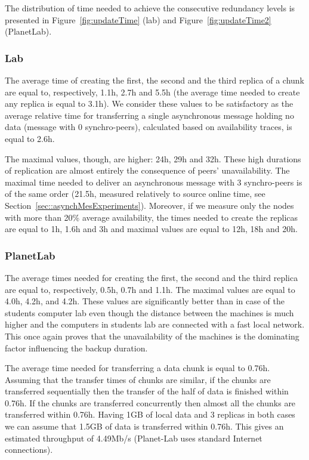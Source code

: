\documentclass[10pt, final, conference, letterpaper]{IEEEtran}
\begin{document}
The distribution of time needed to achieve the consecutive redundancy levels is presented in Figure~\ref{fig:updateTime} (lab) and Figure~\ref{fig:updateTime2} (PlanetLab).

\subsubsection{Lab}

The average time of creating the first, the second and the third replica of a chunk are equal to, respectively, 1.1h, 2.7h and 5.5h (the average time needed to create any replica is equal to 3.1h). We consider these values to be satisfactory as the average relative time for transferring a single asynchronous message holding no data (message with 0 synchro-peers), calculated based on availability traces, is equal to 2.6h. 

The maximal values, though, are higher: 24h, 29h and 32h. These high durations of replication are almost entirely the consequence of peers' unavailability. The maximal time needed to deliver an asynchronous message with 3 synchro-peers is of the same order (21.5h, measured relatively to source online time, see Section~\ref{sec::asynchMesExperiments}). Moreover, if we measure only the nodes with more than 20\% average availability, the times needed to create the replicas are equal to 1h, 1.6h and 3h and maximal values are equal to 12h, 18h and 20h.


\subsubsection{PlanetLab}

The average times needed for creating the first, the second and the third replica are equal to, respectively, 0.5h, 0.7h and 1.1h. The maximal values are equal to 4.0h, 4.2h, and 4.2h. These values are significantly better than in case of the students computer lab even though the distance between the machines is much higher and the computers in students lab are connected with a fast local network. This once again proves that the unavailability of the machines is the dominating factor influencing the backup duration.

The average time needed for transferring a data chunk is equal to 0.76h. Assuming that the transfer times of chunks are similar, if the chunks are transferred sequentially then the transfer of the half of data is finished within 0.76h. If the chunks are transferred concurrently then almost all the chunks are transferred within 0.76h. Having 1GB of local data and 3 replicas in both cases we can assume that 1.5GB of data is transferred within 0.76h. This gives an estimated throughput of 4.49Mb/s (Planet-Lab uses standard Internet connections).
\end{document}
